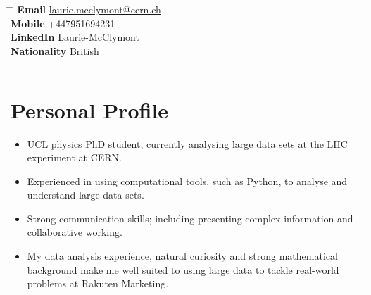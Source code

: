 \documentclass[10pt]{article} %
\begin{document}


\parbox{0.5\textwidth}{ %
\title{} %
}
\hspace{2cm} %
\parbox{0.5\textwidth}{ %
  \begin{tabbing} %
    \hspace{2.3cm} \= \hspace{3cm} \= \kill %
           {\bf Email} \> \href{mailto:laurie.mcclymont@cern.ch}{laurie.mcclymont@cern.ch} \\ %
           {\bf Mobile} \> +447951694231  \\ %
           {\bf LinkedIn} \> \href{https://www.linkedin.com/in/laurie-mcclymont-695520118/}{Laurie-McClymont} \\%
           {\bf Nationality} \> British
  \end{tabbing}
}

\rule{\textwidth}{0.5mm}


\vspace{-2mm}
\section{Personal Profile}
\begin{itemize}
\item{UCL physics PhD student, currently analysing large data sets at the LHC experiment at CERN.}
\item{Experienced in using computational tools, such as Python, to analyse and understand large data sets.}
\item{Strong communication skills; including presenting complex information and collaborative working.}
\item{My data analysis experience, natural curiosity and strong mathematical background make me well suited
  to using large data to tackle real-world problems at Rakuten Marketing.}
\end{itemize}
\end{document}
